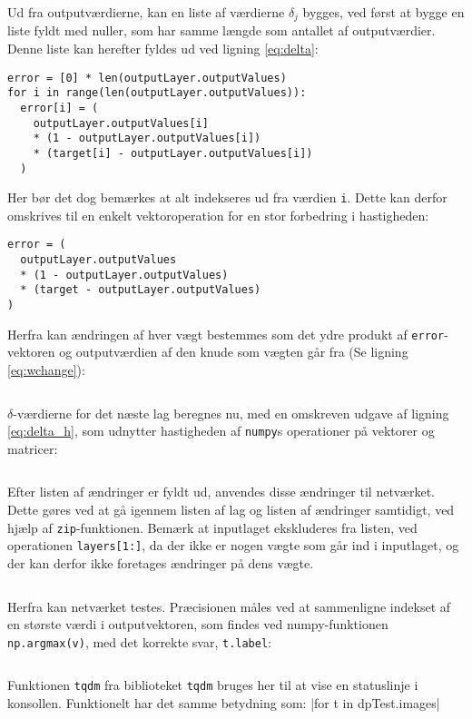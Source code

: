 \documentclass[../SOP.tex]{subfile}
\begin{document}
Ud fra outputværdierne, kan en liste af værdierne $\delta_j$ bygges, ved først at bygge en liste fyldt med nuller, som har samme længde som antallet af outputværdier. Denne liste kan herefter fyldes ud ved ligning \ref{eq:delta}:
\begin{verbatim}
error = [0] * len(outputLayer.outputValues) 
for i in range(len(outputLayer.outputValues)):
  error[i] = (
    outputLayer.outputValues[i]
    * (1 - outputLayer.outputValues[i]) 
    * (target[i] - outputLayer.outputValues[i])
  )
\end{verbatim}
Her bør det dog bemærkes at alt indekseres ud fra værdien \texttt{i}. Dette kan derfor omskrives til en enkelt vektoroperation for en stor forbedring i hastigheden:
\begin{verbatim}
error = (
  outputLayer.outputValues
  * (1 - outputLayer.outputValues)
  * (target - outputLayer.outputValues)
)
\end{verbatim}
Herfra kan ændringen af hver vægt bestemmes som det ydre produkt af \texttt{error}-vektoren og outputværdien af den knude som vægten går fra (Se ligning \ref{eq:wchange}):
\inputminted[firstline=104,lastline=110,gobble=8]{python3}{./Code/main.py}
$\delta$-værdierne for det næste lag beregnes nu, med en omskreven udgave af ligning \ref{eq:delta_h}, som udnytter hastigheden af \texttt{numpy}s operationer på vektorer og matricer:
\inputminted[firstline=111,lastline=115,gobble=8]{python3}{./Code/main.py}
Efter listen af ændringer er fyldt ud, anvendes disse ændringer til netværket. Dette gøres ved at gå igennem listen af lag og listen af ændringer samtidigt, ved hjælp af \texttt{zip}-funktionen. Bemærk at inputlaget ekskluderes fra listen, ved operationen \texttt{layers[1:]}, da der ikke er nogen vægte som går ind i inputlaget, og der kan derfor ikke foretages ændringer på dens vægte.
\inputminted[firstline=116,lastline=118,gobble=8]{python3}{./Code/main.py}
Herfra kan netværket testes. Præcisionen måles ved at sammenligne indekset af en største værdi i outputvektoren, som findes ved numpy-funktionen \texttt{np.argmax(v)}, med det korrekte svar, \texttt{t.label}:
\inputminted[firstline=121,lastline=131]{python3}{./Code/main.py}
Funktionen \texttt{tqdm} fra biblioteket \texttt{tqdm} bruges her til at vise en statuslinje i konsollen. Funktionelt har det samme betydning som:
|for t in dpTest.images|
\end{document}
